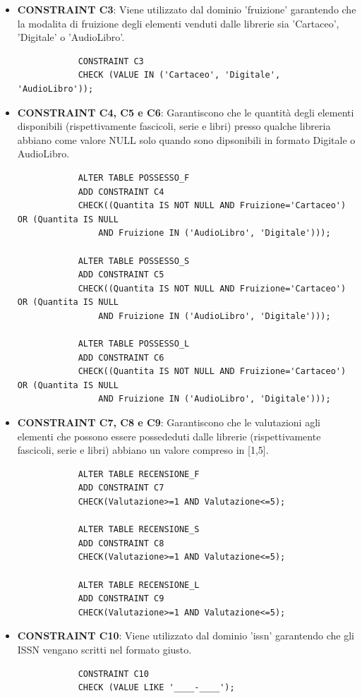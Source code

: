 \documentclass{article}
\begin{document}
\begin{itemize}
    \item \textbf{CONSTRAINT C3}: Viene utilizzato dal dominio 'fruizione' garantendo che la modalita di fruizione degli elementi venduti dalle librerie sia 'Cartaceo', 'Digitale' o 'AudioLibro'.
        \begin{verbatim}
            CONSTRAINT C3
            CHECK (VALUE IN ('Cartaceo', 'Digitale', 'AudioLibro'));
        \end{verbatim}

    \item \textbf{CONSTRAINT C4, C5 e C6}: Garantiscono che le quantità degli elementi disponibili (rispettivamente fascicoli, serie e libri) presso qualche libreria abbiano come valore NULL solo quando sono dipsonibili in formato Digitale o AudioLibro.
        \begin{verbatim}
            ALTER TABLE POSSESSO_F
            ADD CONSTRAINT C4
            CHECK((Quantita IS NOT NULL AND Fruizione='Cartaceo') OR (Quantita IS NULL 
                AND Fruizione IN ('AudioLibro', 'Digitale')));

            ALTER TABLE POSSESSO_S
            ADD CONSTRAINT C5
            CHECK((Quantita IS NOT NULL AND Fruizione='Cartaceo') OR (Quantita IS NULL 
                AND Fruizione IN ('AudioLibro', 'Digitale')));

            ALTER TABLE POSSESSO_L
            ADD CONSTRAINT C6
            CHECK((Quantita IS NOT NULL AND Fruizione='Cartaceo') OR (Quantita IS NULL 
                AND Fruizione IN ('AudioLibro', 'Digitale')));
        \end{verbatim} 

        \item \textbf{CONSTRAINT C7, C8 e C9}: Garantiscono che le valutazioni agli elementi che possono essere possededuti dalle librerie (rispettivamente fascicoli, serie e libri) abbiano un valore compreso in [1,5].
        \newpage
        \begin{verbatim}
            ALTER TABLE RECENSIONE_F
            ADD CONSTRAINT C7
            CHECK(Valutazione>=1 AND Valutazione<=5); 

            ALTER TABLE RECENSIONE_S
            ADD CONSTRAINT C8
            CHECK(Valutazione>=1 AND Valutazione<=5);

            ALTER TABLE RECENSIONE_L
            ADD CONSTRAINT C9
            CHECK(Valutazione>=1 AND Valutazione<=5);
        \end{verbatim} 

        \item \textbf{CONSTRAINT C10}: Viene utilizzato dal dominio 'issn' garantendo che gli ISSN vengano scritti nel formato giusto.
        \begin{verbatim}
            CONSTRAINT C10
            CHECK (VALUE LIKE '____-____');
        \end{verbatim}


\end{itemize}
\end{document}
